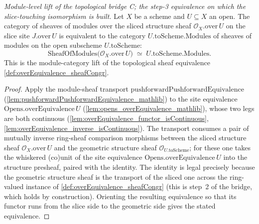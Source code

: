 \begin{definition}

  \label{def:over_restrict_equiv}
  \textit{Module-level lift of the topological bridge C; the step-3 equivalence on which the
  slice-touching isomorphism is built.}
  Let \(X\) be a scheme and \(U \subseteq X\) an open. The category of sheaves of modules over the
  sliced structure sheaf \(\mathcal{O}_X.\mathrm{over}\,U\) on the slice site \(J.\mathrm{over}\,U\) is
  equivalent to the category \(U.\mathrm{toScheme}.\mathrm{Modules}\) of sheaves of modules on the open
  subscheme \(U.\mathrm{toScheme}\):
  \[
    \mathrm{SheafOfModules}\bigl(\mathcal{O}_X.\mathrm{over}\,U\bigr)
      \;\simeq\; U.\mathrm{toScheme}.\mathrm{Modules}.
  \]
  This is the module-category lift of the topological sheaf equivalence
  \cref{def:overEquivalence_sheafCongr}.
\end{definition}
\begin{proof}
  Apply the module-sheaf transport \(\mathrm{pushforwardPushforwardEquivalence}\)
  (\cref{lem:pushforwardPushforwardEquivalence_mathlib}) to the site equivalence
  \(\mathrm{Opens.overEquivalence}\,U\) (\cref{lem:opens_overEquivalence_mathlib}), whose two legs are
  both continuous (\cref{lem:overEquivalence_functor_isContinuous},
  \cref{lem:overEquivalence_inverse_isContinuous}). The transport consumes a pair of mutually inverse
  ring-sheaf comparison morphisms between the sliced structure sheaf
  \(\mathcal{O}_X.\mathrm{over}\,U\) and the geometric structure sheaf
  \(\mathcal{O}_{U.\mathrm{toScheme}}\); for these one takes the whiskered (co)unit of the site
  equivalence \(\mathrm{Opens.overEquivalence}\,U\) into the structure presheaf, paired with the
  identity. The identity is legal precisely because the geometric structure sheaf is
  the transport of the sliced one across the ring-valued instance of
  \cref{def:overEquivalence_sheafCongr} (this is step~2 of the bridge, which holds by
  construction). Orienting the resulting equivalence so that its functor runs from the slice
  side to the geometric side gives the stated equivalence.
\end{proof}

